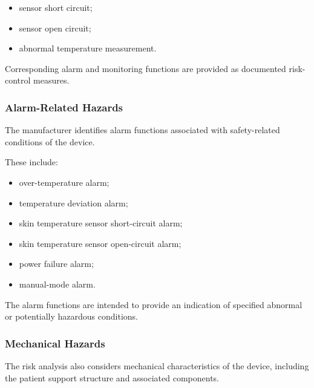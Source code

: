 \begin{itemize}

    \item sensor short circuit;

    \item sensor open circuit;

    \item abnormal temperature measurement.

\end{itemize}

Corresponding alarm and monitoring functions are provided as documented
risk-control measures.

\subsubsection{Alarm-Related Hazards}

The manufacturer identifies alarm functions associated with safety-related
conditions of the device.

These include:

\begin{itemize}

    \item over-temperature alarm;

    \item temperature deviation alarm;

    \item skin temperature sensor short-circuit alarm;

    \item skin temperature sensor open-circuit alarm;

    \item power failure alarm;

    \item manual-mode alarm.

\end{itemize}

The alarm functions are intended to provide an indication of specified
abnormal or potentially hazardous conditions.

\subsubsection{Mechanical Hazards}

The risk analysis also considers mechanical characteristics of the device,
including the patient support structure and associated components.

